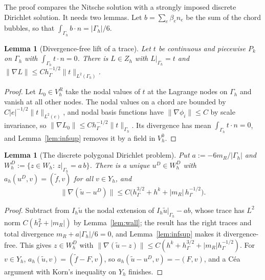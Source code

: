 \documentclass[pdflatex,sn-mathphys-num]{sn-jnl}
\theoremstyle{thmstyleone}
\newtheorem{lemma}[theorem]{Lemma}
\theoremstyle{thmstylethree}
\newcommand{\hG}{h_\Gamma}
\newcommand{\Gh}{\Gamma_h}
\newcommand{\VR}{V_h^R}
\newcommand{\VO}{V_h^0}
\newcommand{\Zh}{Z_h}
\newcommand{\Wh}{W_h}
\newcommand{\Yh}{Y_h}
\newcommand{\ut}{\tilde u}
\newcommand{\ft}{\tilde f}
\newcommand{\norm}[1]{\lVert #1\rVert}
\begin{document}
The proof compares the Nitsche solution with a strongly imposed discrete Dirichlet solution. It needs two lemmas. Let $b=\sum_e\beta_en_e$ be the sum of the chord bubbles, so that $\int_{\Gh}b\cdot n=|\Gh|/6$.

\begin{lemma}[Divergence-free lift of a trace]\label{lem:lift}
Let $t$ be continuous and piecewise $P_k$ on $\Gh$ with $\int_{\Gh}t\cdot n=0$. There is $L\in\Zh$ with $L|_{\Gh}=t$ and $\norm{\nabla L}\le C\hG^{-1/2}\norm{t}_{L^2(\Gh)}$.
\end{lemma}

\begin{proof}
Let $L_0\in\VR$ take the nodal values of $t$ at the Lagrange nodes on $\Gh$ and vanish at all other nodes. The nodal values on a chord are bounded by $C|e|^{-1/2}\norm{t}_{L^2(e)}$, and nodal basis functions have $\norm{\nabla\phi_i}\le C$ by scale invariance, so $\norm{\nabla L_0}\le C\hG^{-1/2}\norm t_{\Gh}$. Its divergence has mean $\int_{\Gh}t\cdot n=0$, and Lemma~\ref{lem:infsup} removes it by a field in $\VO$.
\end{proof}

\begin{lemma}[The discrete polygonal Dirichlet problem]\label{lem:dir}
Put $a:=-6m_R/|\Gh|$ and $\Wh^D:=\{z\in\Wh:\ z|_{\Gh}=a\,b\}$. There is a unique $u^D\in\Wh^D$ with $a_h(u^D,v)=(\ft,v)$ for all $v\in\Yh$, and
\[
\norm{\nabla(\ut-u^D)}\le C\bigl(\hG^{3/2}+h^k+|m_R|\,\hG^{-1/2}\bigr).
\]
\end{lemma}

\begin{proof}
Subtract from $I_h\ut$ the nodal extension of $I_h\ut|_{\Gh}-ab$, whose trace has $L^2$ norm $C(\hG^2+|m_R|)$ by Lemma~\ref{lem:wall}; the result has the right traces and total divergence $m_R+a|\Gh|/6=0$, and Lemma~\ref{lem:infsup} makes it divergence-free. This gives $z\in\Wh^D$ with $\norm{\nabla(\ut-z)}\le C(h^k+\hG^{3/2}+|m_R|\hG^{-1/2})$. For $v\in\Yh$, $a_h(\ut,v)=(\ft-F,v)$, so $a_h(\ut-u^D,v)=-(F,v)$, and a C\'ea argument with Korn's inequality on $\Yh$ finishes.
\end{proof}
\end{document}
